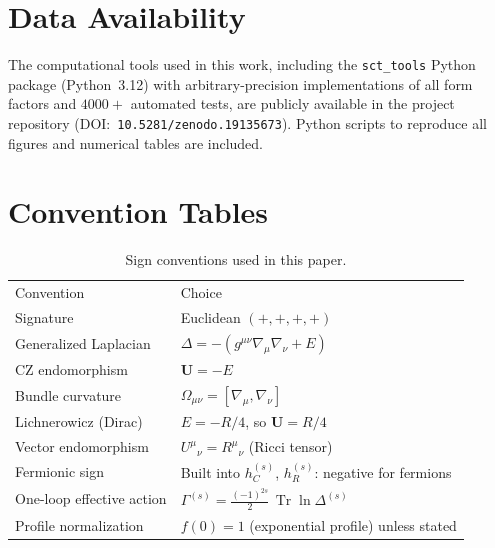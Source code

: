 \documentclass[aps,prd,twocolumn,superscriptaddress,nofootinbib,floatfix]{revtex4-2}
\theoremstyle{definition}
\theoremstyle{remark}
\newcommand{\Tr}{\operatorname{Tr}}
\begin{document}
\section*{Data Availability}
The computational tools used in this work, including the
\texttt{sct\_tools} Python package (Python~3.12) with arbitrary-precision
implementations of all form factors and $4000+$ automated tests, are publicly
available in the project repository (DOI:~\texttt{10.5281/zenodo.19135673}).
Python scripts to reproduce all figures and numerical tables are included.

\appendix

\section{Convention Tables}
\label{app:conventions}

\begin{table}[h]
\caption{Sign conventions used in this paper.}
\begin{ruledtabular}
\begin{tabular}{ll}
Convention & Choice \\
\colrule
Signature & Euclidean $(+,+,+,+)$ \\
Generalized Laplacian & $\Delta = -(g^{\mu\nu}\nabla_\mu\nabla_\nu + E)$ \\
CZ endomorphism & $\mathbf{U} = -E$ \\
Bundle curvature & $\Omega_{\mu\nu} = [\nabla_\mu, \nabla_\nu]$ \\
Lichnerowicz (Dirac) & $E = -R/4$, so $\mathbf{U} = R/4$ \\
Vector endomorphism & $U^\mu{}_\nu = R^\mu{}_\nu$ (Ricci tensor) \\
Fermionic sign & Built into $h_C^{(s)}$, $h_R^{(s)}$: negative for fermions \\
One-loop effective action & $\Gamma^{(s)} = \frac{(-1)^{2s}}{2}\,\Tr\ln\Delta^{(s)}$ \\
Profile normalization & $f(0) = 1$ (exponential profile) unless stated \\
\end{tabular}
\end{ruledtabular}
\end{table}
\end{document}
